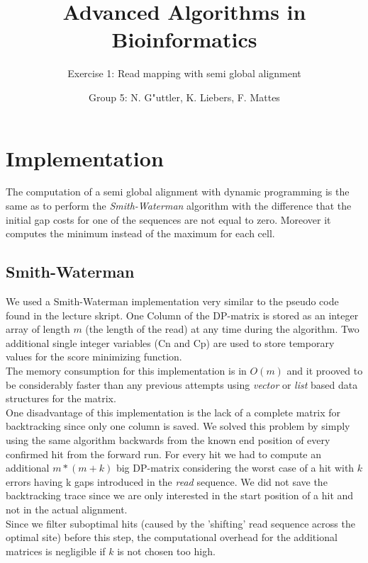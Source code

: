 \documentclass[11pt, notitlepage]{scrartcl}
\begin{document}
         


\title{Advanced Algorithms in Bioinformatics} 
\subtitle{Exercise 1: Read mapping with semi global alignment}
\author{Group 5: N. G"uttler, K. Liebers, F. Mattes} %
\maketitle

\section{Implementation}
The computation of a semi global alignment with dynamic programming is the same as to perform the \textit{Smith-Waterman} algorithm with the difference 
that the initial gap costs for one of the sequences are not equal to zero. Moreover it computes the minimum instead of the maximum for each cell.\\

\subsection{Smith-Waterman}
We used a Smith-Waterman implementation very similar to the pseudo code found in the lecture skript. One Column of the DP-matrix is stored as an integer array
of length $m$ (the length of the read) at any time during the algorithm. Two additional single integer variables (Cn and Cp) are used to store temporary values
for the score minimizing function.\\
The memory consumption for this implementation is in $O(m)$ and it prooved to be considerably faster than any previous attempts using {\it vector} or {\it list} based data structures for the matrix.\\
One disadvantage of this implementation is the lack of a complete matrix for backtracking since only one column is saved. We solved this problem
by simply using the same algorithm backwards from the known end position of every confirmed hit from the forward run. For every hit we had to compute an additional $m*(m+k)$ big DP-matrix
considering the worst case of a hit with $k$ errors having k gaps introduced in the {\it read} sequence. We did not save the backtracking trace since we are only interested
in the start position of a hit and not in the actual alignment. \\
Since we filter suboptimal hits (caused by the 'shifting' read sequence across the optimal site) before this step, the computational overhead for the additional matrices is 
negligible if $k$ is not chosen too high.\\
 
\end{document}
